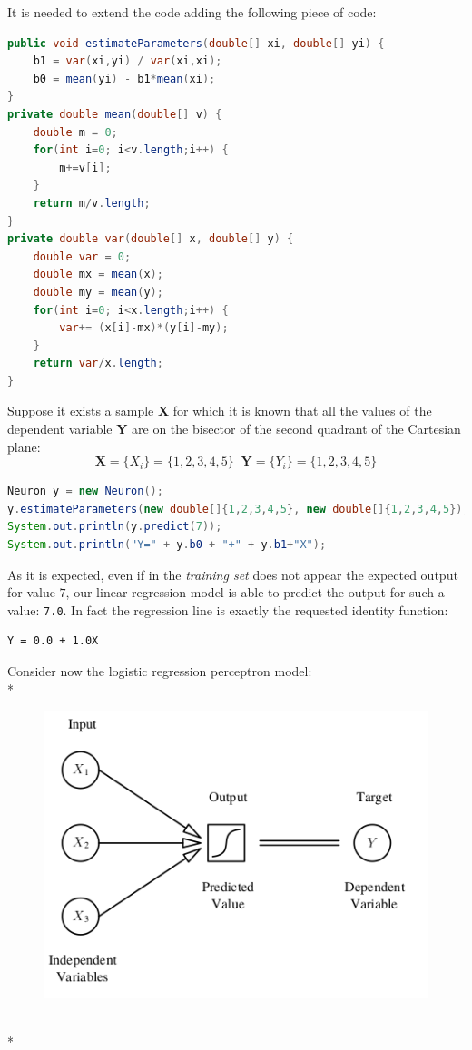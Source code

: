 \documentclass[10pt,a4paper]{article}
\begin{document}
	It is needed to extend the code adding the following piece of code:
	\begin{lstlisting}[language = Java]
public void estimateParameters(double[] xi, double[] yi) {
	b1 = var(xi,yi) / var(xi,xi);
	b0 = mean(yi) - b1*mean(xi);
}
private double mean(double[] v) {
	double m = 0;
	for(int i=0; i<v.length;i++) {
		m+=v[i];
	}
	return m/v.length;
}
private double var(double[] x, double[] y) {
	double var = 0;
	double mx = mean(x);
	double my = mean(y);
	for(int i=0; i<x.length;i++) {
		var+= (x[i]-mx)*(y[i]-my);
	}
	return var/x.length;
}
\end{lstlisting}
Suppose it exists a sample \textbf{X} for which it is known that all the values of the dependent variable \textbf{Y} are on the bisector of the second quadrant of the Cartesian plane:
$$
\textbf{X} = \{X_i\} = \{1,2,3,4,5\}
\;\;
\textbf{Y} = \{Y_i\} = \{1,2,3,4,5\}
$$
\begin{lstlisting}[language = Java]
Neuron y = new Neuron();
y.estimateParameters(new double[]{1,2,3,4,5}, new double[]{1,2,3,4,5});
System.out.println(y.predict(7));
System.out.println("Y=" + y.b0 + "+" + y.b1+"X");
\end{lstlisting}
As it is expected, even if in the \emph{training set} does not appear the expected output for value $7$, our linear regression model is able to predict the output for such a value: \texttt{7.0}.
In fact the regression line is exactly the requested identity function:
\begin{lstlisting}
Y = 0.0 + 1.0X
\end{lstlisting}
Consider now the logistic regression perceptron model:\\*
	\begin{figure}[h!]
	\centering
	\includegraphics[scale=1.7]{img/logreg}
\end{figure}\\*
\end{document}
